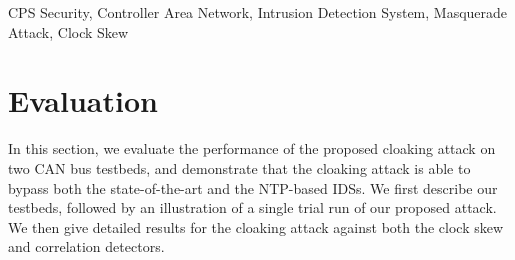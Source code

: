 \documentclass[conference]{IEEEtran}
\begin{document}
\maketitle




\begin{IEEEkeywords}
CPS Security, Controller Area Network, Intrusion Detection System, Masquerade Attack, Clock Skew
\end{IEEEkeywords}












%
\section{Evaluation}
\label{sec:evaluation}
In this section, we  evaluate the performance of the proposed cloaking attack on two CAN bus testbeds, and demonstrate that the cloaking attack is able to bypass both the state-of-the-art and the NTP-based IDSs.
We first describe our testbeds, followed by an illustration of a single trial run of our proposed attack. We then give detailed results for the cloaking attack against both the clock skew and correlation detectors.









% 





\end{document}

